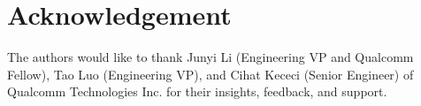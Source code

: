 \section{Acknowledgement}
The authors would like to thank Junyi Li (Engineering VP and Qualcomm Fellow), Tao Luo (Engineering VP), and Cihat Kececi (Senior Engineer) of Qualcomm Technologies Inc. for their insights, feedback, and support.